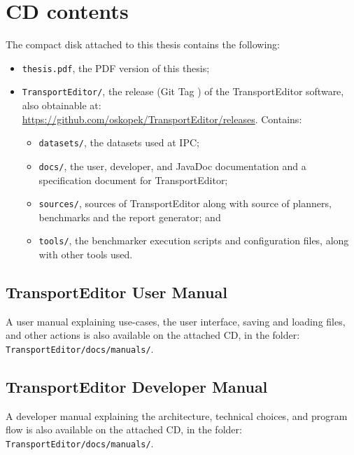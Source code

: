 
\section*{CD contents}\label{cd-contents}

The compact disk attached to this thesis contains the following:

\begin{itemize}
\item \verb+thesis.pdf+, the PDF version of this thesis;
\item \verb+TransportEditor/+, the \TEver{} release (Git Tag \TEtag{}) of the TransportEditor software, also obtainable at:\\
\url{https://github.com/oskopek/TransportEditor/releases}. Contains:
\begin{itemize}
\item \verb+datasets/+, the datasets used at IPC;
\item \verb+docs/+, the user, developer, and JavaDoc documentation and a specification document for TransportEditor;
\item \verb+sources/+, sources of TransportEditor along with source of planners, benchmarks and the report generator; and
\item \verb+tools/+, the benchmarker execution scripts and configuration files, along with other tools used.
\end{itemize}
\end{itemize}

\subsection*{TransportEditor User Manual}\label{transporteditor-user-manual}

A user manual explaining use-cases, the user interface, saving and loading files,
and other actions is also available on the attached CD, in the folder:\\
\verb+TransportEditor/docs/manuals/+.

\subsection*{TransportEditor Developer Manual}\label{transporteditor-developer-manual}

A developer manual explaining the architecture, technical choices, and program flow
is also available on the attached CD, in the folder:\\
\verb+TransportEditor/docs/manuals/+.

